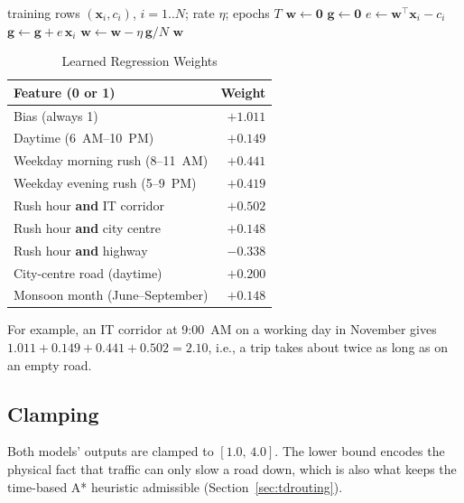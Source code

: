 \documentclass[conference]{IEEEtran}
\begin{document}
\begin{algorithm}[t]
\caption{Batch Gradient Descent for the Congestion Model}
\label{alg:gd}
\begin{algorithmic}[1]
\Require training rows $(\mathbf{x}_i, c_i)$, $i=1..N$; rate $\eta$; epochs $T$
\State $\mathbf{w} \gets \mathbf{0}$
  \State $\mathbf{g} \gets \mathbf{0}$
    \State $e \gets \mathbf{w}^\top \mathbf{x}_i - c_i$ 
    \State $\mathbf{g} \gets \mathbf{g} + e\,\mathbf{x}_i$
  \EndFor
  \State $\mathbf{w} \gets \mathbf{w} - \eta\,\mathbf{g}/N$
\EndFor
\State \Return $\mathbf{w}$
\end{algorithmic}
\end{algorithm}

\begin{table}[t]
\caption{Learned Regression Weights}
\label{tab:weights}
\centering
\begin{tabular}{@{}lr@{}}
\toprule
Feature (0 or 1) & Weight \\
\midrule
Bias (always 1)                      & $+1.011$ \\
Daytime (6~AM--10~PM)                & $+0.149$ \\
Weekday morning rush (8--11~AM)      & $+0.441$ \\
Weekday evening rush (5--9~PM)       & $+0.419$ \\
Rush hour \textbf{and} IT corridor   & $+0.502$ \\
Rush hour \textbf{and} city centre   & $+0.148$ \\
Rush hour \textbf{and} highway       & $-0.338$ \\
City-centre road (daytime)           & $+0.200$ \\
Monsoon month (June--September)      & $+0.148$ \\
\bottomrule
\end{tabular}
\end{table}

For example, an IT corridor at 9:00~AM on a working day in November
gives $1.011+0.149+0.441+0.502 = 2.10$, i.e., a trip takes about twice
as long as on an empty road.

\subsection{Clamping}
Both models' outputs are clamped to $[1.0,\,4.0]$. The lower bound
encodes the physical fact that traffic can only slow a road down, which
is also what keeps the time-based A* heuristic admissible
(Section~\ref{sec:tdrouting}).
\end{document}
